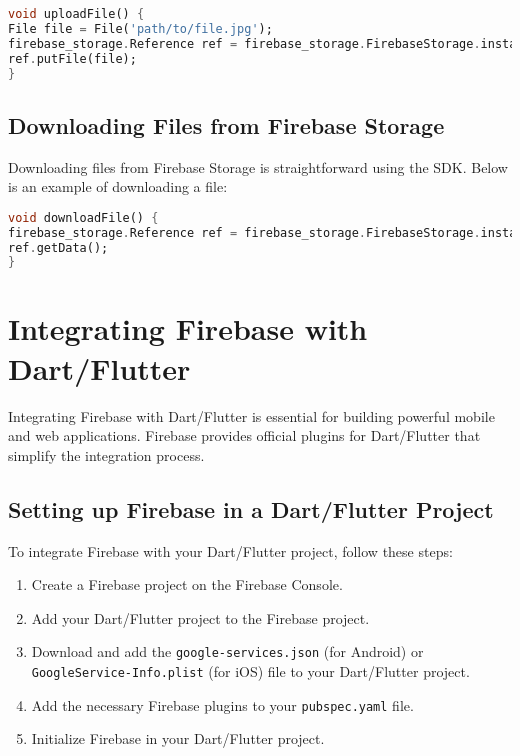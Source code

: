 \documentclass[12pt]{article}
\begin{document}
\begin{lstlisting}[language=Dart, caption={Uploading a file to Firebase Storage}]
void uploadFile() {
File file = File('path/to/file.jpg');
firebase_storage.Reference ref = firebase_storage.FirebaseStorage.instance.ref('path/to/upload.jpg');
ref.putFile(file);
}
\end{lstlisting}

\subsection{Downloading Files from Firebase Storage}
Downloading files from Firebase Storage is straightforward using the SDK. Below is an example of downloading a file:

\begin{lstlisting}[language=Dart, caption={Downloading a file from Firebase Storage}]
void downloadFile() {
firebase_storage.Reference ref = firebase_storage.FirebaseStorage.instance.ref('path/to/file.jpg');
ref.getData();
}
\end{lstlisting}

\section{Integrating Firebase with Dart/Flutter}
Integrating Firebase with Dart/Flutter is essential for building powerful mobile and web applications. Firebase provides official plugins for Dart/Flutter that simplify the integration process.

\subsection{Setting up Firebase in a Dart/Flutter Project}
To integrate Firebase with your Dart/Flutter project, follow these steps:
\begin{enumerate}
\item Create a Firebase project on the Firebase Console.
\item Add your Dart/Flutter project to the Firebase project.
\item Download and add the \texttt{google-services.json} (for Android) or \texttt{GoogleService-Info.plist} (for iOS) file to your Dart/Flutter project.
\item Add the necessary Firebase plugins to your \texttt{pubspec.yaml} file.
\item Initialize Firebase in your Dart/Flutter project.
\end{enumerate}
\end{document}
